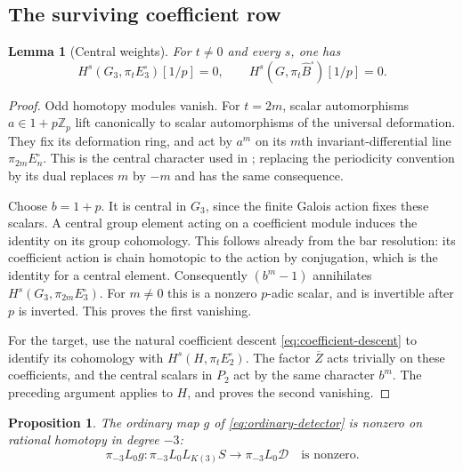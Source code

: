 \documentclass[11pt]{article}
\numberwithin{equation}{section}
\newtheorem{proposition}[theorem]{Proposition}
\newtheorem{lemma}[theorem]{Lemma}
\theoremstyle{definition}
\theoremstyle{remark}
\newcommand{\Z}{\mathbb Z}
\begin{document}
\subsection{The surviving coefficient row}

\begin{lemma}[Central weights]\label{lem:central-weights}
For $t\ne0$ and every $s$, one has
\[
 H^s(G_3,\pi_tE_3^{\square})[1/p]=0,
 \qquad
 H^s(G,\pi_t\widehat B^{\square})[1/p]=0.
\]
\end{lemma}

\begin{proof}
Odd homotopy modules vanish.  For $t=2m$, scalar automorphisms
$a\in1+p\Z_p$ lift canonically to scalar automorphisms of the universal
deformation.  They fix its deformation ring, and act by $a^m$ on its
$m$th invariant-differential line $\pi_{2m}E_n^{\square}$.
This is the central character used in
\cite[Lemma~2.6.1]{BSSW2025}; replacing the periodicity convention by its
dual replaces $m$ by $-m$ and has the same consequence.

Choose $b=1+p$.  It is central in $G_3$, since the finite Galois action
fixes these scalars.  A central group element acting on a coefficient
module induces the identity on its group cohomology.  This follows
already from the bar resolution: its coefficient action is chain
homotopic to the action by conjugation, which is the identity for a
central element.  Consequently $(b^m-1)$ annihilates
$H^s(G_3,\pi_{2m}E_3^{\square})$.  For $m\ne0$ this is a nonzero
$p$-adic scalar, and is invertible after $p$ is inverted.  This proves
the first vanishing.

For the target, use the natural coefficient descent
\eqref{eq:coefficient-descent} to identify its cohomology with
$H^s(H,\pi_tE_2^{\square})$.  The factor $\overline Z$ acts trivially
on these coefficients, and the central scalars in $P_2$ act by the same
character $b^m$.  The preceding argument applies to $H$, and proves
the second vanishing.
\end{proof}

\begin{proposition}\label{prop:nonzero-detector}
The ordinary map $g$ of \eqref{eq:ordinary-detector} is nonzero on
rational homotopy in degree $-3$:
\[
 \pi_{-3}L_0g:\pi_{-3}L_0L_{K(3)}S
                    \longrightarrow\pi_{-3}L_0\mathcal D
 \quad\text{is nonzero}.
\]
\end{proposition}
\end{document}

